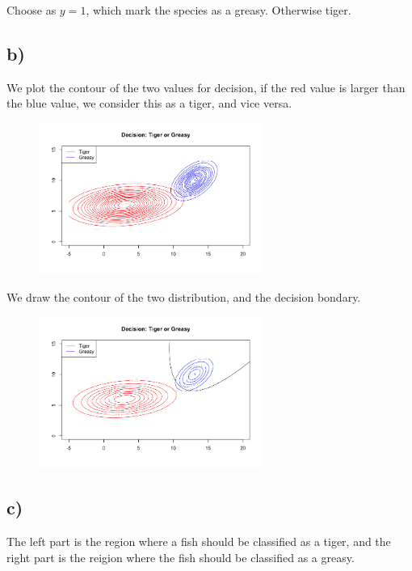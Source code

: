\documentclass[12pt]{article}
\begin{document}
\begin{flushleft}
\qquad Choose as $y=1$, which mark the species as a greasy. Otherwise tiger.

\newpage

\subsection*{b)}

\qquad We plot the contour of the two values for decision, if the red value is larger than the blue value, we consider this as a tiger, and vice versa.

\begin{figure}[h]
\centering
\includegraphics[width = 0.65\textwidth]{DB.png}
\end{figure}

\qquad We draw the contour of the two distribution, and the decision bondary.

\begin{figure}[h]
\centering
\includegraphics[width = 0.65\textwidth]{TG.png}
\end{figure}

\subsection*{c)}

\qquad The left part is the region where a fish should be classified as a tiger, and the right part is the reigion where the fish should be classified as a greasy.

\end{flushleft}
\end{document}
